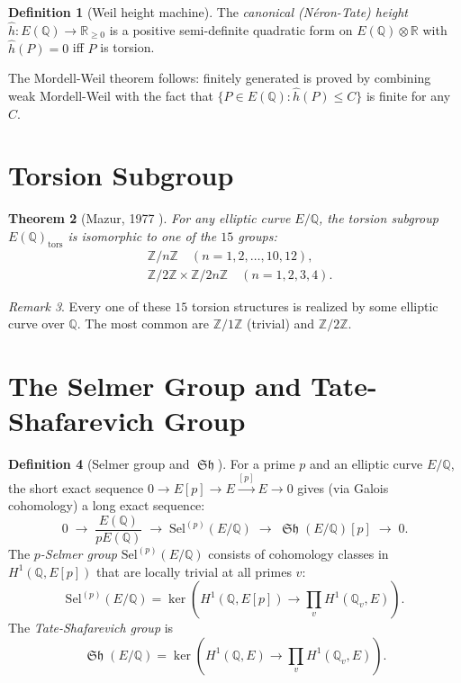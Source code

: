 \documentclass[12pt,a4paper]{amsart}
\newtheorem{theorem}{Theorem}[section]
\theoremstyle{definition}
\newtheorem{definition}[theorem]{Definition}
\theoremstyle{remark}
\newtheorem{remark}[theorem]{Remark}
\newcommand{\Z}{\mathbb{Z}}
\newcommand{\Q}{\mathbb{Q}}
\newcommand{\R}{\mathbb{R}}
\newcommand{\Sel}{\mathrm{Sel}}
\DeclareMathOperator{\Sha}{\mathfrak{Sh}}
\begin{document}
\begin{definition}[Weil height machine]
  The \emph{canonical (Néron-Tate) height} $\hat{h}\colon E(\Q) \to \R_{\geq 0}$ is a
  positive semi-definite quadratic form on $E(\Q) \otimes \R$ with $\hat{h}(P) = 0$
  iff $P$ is torsion.
\end{definition}

The Mordell-Weil theorem follows: finitely generated is proved by combining weak
Mordell-Weil with the fact that $\{P \in E(\Q) : \hat{h}(P) \leq C\}$ is finite for any $C$.

\section{Torsion Subgroup}\label{sec:torsion}

\begin{theorem}[Mazur, 1977 \cite{Mazur1977}]
  For any elliptic curve $E/\Q$, the torsion subgroup $E(\Q)_{\mathrm{tors}}$ is
  isomorphic to one of the $15$ groups:
  \begin{align*}
    &\Z/n\Z \quad (n = 1,2,\ldots,10,12), \\
    &\Z/2\Z \times \Z/2n\Z \quad (n = 1,2,3,4).
  \end{align*}
\end{theorem}

\begin{remark}
  Every one of these $15$ torsion structures is realized by some elliptic curve over $\Q$.
  The most common are $\Z/1\Z$ (trivial) and $\Z/2\Z$.
\end{remark}

\section{The Selmer Group and Tate-Shafarevich Group}\label{sec:selmer}

\begin{definition}[Selmer group and $\Sha$]
  For a prime $p$ and an elliptic curve $E/\Q$, the short exact sequence
  $0 \to E[p] \to E \xrightarrow{[p]} E \to 0$
  gives (via Galois cohomology) a long exact sequence:
  \[
    0 \;\to\; \frac{E(\Q)}{pE(\Q)} \;\to\; \Sel^{(p)}(E/\Q) \;\to\; \Sha(E/\Q)[p] \;\to\; 0.
  \]
  The \emph{$p$-Selmer group} $\Sel^{(p)}(E/\Q)$ consists of cohomology classes in
  $H^1(\Q, E[p])$ that are locally trivial at all primes $v$:
  \[
    \Sel^{(p)}(E/\Q) = \ker\left(H^1(\Q, E[p]) \to \prod_v H^1(\Q_v, E)\right).
  \]
  The \emph{Tate-Shafarevich group} is
  \[
    \Sha(E/\Q) = \ker\left(H^1(\Q, E) \to \prod_v H^1(\Q_v, E)\right).
  \]
\end{definition}
\end{document}
